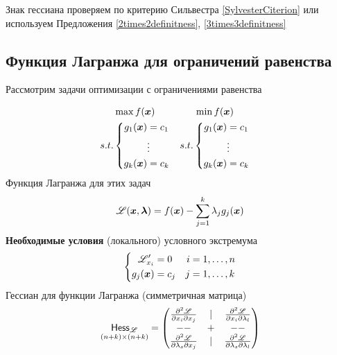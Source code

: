 \begin{remark}
Знак гессиана проверяем по критерию Сильвестра 
\ref{SylvesterCiterion} или
используем Предложения \ref{2times2definitness}, \ref{3times3definitness}
\end{remark}


\subsection{Функция Лагранжа для ограничений равенства}

Рассмотрим задачи оптимизации с ограничениями равенства

\begin{align*}
	& \begin{gathered}
		\max f({\bm x}) \\
		s.t.\left\{\begin{aligned}
			g_1({\bm x})&=c_1 \\ &\vdots \\ g_k({\bm x})&=c_k
		\end{aligned}\right.
	\end{gathered} &
	& \begin{gathered}
		\min f({\bm x}) \\
		s.t.\left\{\begin{aligned}
			g_1({\bm x})&=c_1 \\ &\vdots \\ g_k({\bm x})&=c_k
		\end{aligned}\right.
	\end{gathered}
\end{align*}
Функция Лагранжа для этих задач
\[
	{\mathscr L}({\bm x},{\bm{ \lambda}})=f({\bm x})-\sum_{j=1}^k \lambda_jg_j({\bm x})
\]
\textbf{Необходимые условия} (локального) условного экстремума
\[
	\left\{\begin{aligned}
		{\mathscr L}'_{x_i}&=0 & i&=1,\ldots,n\\
		g_j({\bm x}) &= c_j & j&=1,\ldots,k
	\end{aligned}\right.
\]
Гессиан для функции Лагранжа (симметричная матрица)
\[
	\underset{(n+k)\times(n+k)}{\mathsf{Hess}_{\mathscr L}}=\begin{pmatrix}
		\frac{\partial^2 {\mathscr L}}{\partial x_i\partial x_j} & | &\frac{\partial^2 {\mathscr L}}{\partial x_i\partial \lambda_l} \\
		-- & + & -- \\
		\frac{\partial^2 {\mathscr L}}{\partial \lambda_s\partial x_j} & | &
		\frac{\partial^2 {\mathscr L}}{\partial \lambda_s\partial \lambda_l}
   \end{pmatrix}
\]
